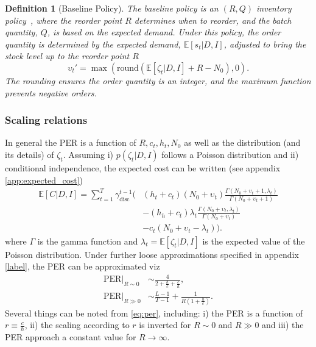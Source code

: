 \documentclass[a4paper,12pt]{article}
\newtheorem{definition}{Definition}
\begin{document}
	\begin{definition}[Baseline Policy]  
		\label{def:baseline}
		The baseline policy is an $(R, Q)$ inventory policy~\citep{bartmann1992inventory,axsaeter2006inventory}, where the reorder point $R$ determines when to reorder, and the batch quantity, $Q$, is based on the expected demand. Under this policy, the order quantity is determined by the expected demand, $\mathbb{E}[s_t|D, I]$, adjusted to bring the stock level up to the reorder point $R$
		\begin{equation}  
			\upsilon_t' = \max(\text{round}(\mathbb{E}[\zeta_t|D, I] + R - N_0), 0).  
		\end{equation}  
		The rounding ensures the order quantity is an integer, and the maximum function prevents negative orders.
	\end{definition}

	
	\subsubsection{Scaling relations}
	In general the PER is a function of $R, c_t, h_t, N_0$ as well as the distribution (and its details) of $\zeta_t$. Assuming i) $p(\zeta_t|D,I)$ follows a Poisson distribution and ii) conditional independence, the expected cost can be written (see appendix \ref{app:expected_cost})
	\begin{equation}
		\begin{split}
			\mathbb{E}[C|D,I] = \sum_{t=1}^{T} \gamma_{\text{disc}}^{t-1} \bigg(& 
			(h_t+c_t)(N_0 + \upsilon_t)\frac{\Gamma(N_0+\upsilon_t+1,\lambda_t)}{\Gamma(N_0+\upsilon_t+1)}\\&- (h_h+c_t)\lambda_t \frac{\Gamma(N_0+\upsilon_t,\lambda_t)}{\Gamma(N_0+\upsilon_t)}\\
			&- c_t(N_0 + \upsilon_t-\lambda_t)\bigg).
		\end{split}
	\end{equation}
	where $\Gamma$ is the gamma function and $\lambda_t=\mathbb{E}[\zeta_t|D, I]$ is the expected value of the Poisson distribution. Under further loose approximations specified in appendix \ref{label}, the PER can be approximated viz
	\begin{equation}
		\begin{split}
			\text{PER}|_{R\sim 0} & \sim \frac{4}{2+\frac{h}{c}+\frac{c}{h}},\\
			\text{PER}|_{R\gg 0} &\sim \frac{L-1}{T-1}+\frac{1}{R(1+\frac{h}{c})}.
		\end{split}
		\label{eq:per}
	\end{equation}
	Several things can be noted from \eqref{eq:per}, including: i) the PER is a function of $r\equiv \frac{c}{h}$, ii) the scaling according to $r$ is inverted for $R\sim 0$ and $R\gg 0$ and iii) the PER approach a constant value for $R\rightarrow \infty$.
	
\end{document}

